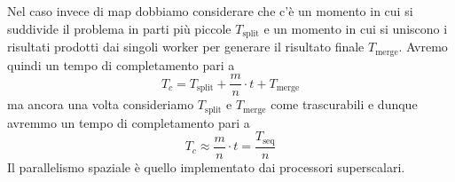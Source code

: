 Nel caso invece di map dobbiamo considerare che c'è un momento in cui si suddivide il problema in
parti più piccole $T_\text{split}$ e un momento in cui si uniscono i risultati prodotti dai singoli
worker per generare il risultato finale $T_\text{merge}$. Avremo quindi un tempo di completamento
pari a
\[ T_c = T_\text{split} + \frac{m}{n} \cdot t + T_\text{merge} \]
ma ancora una volta consideriamo $T_\text{split}$ e $T_\text{merge}$ come trascurabili e dunque
avremmo un tempo di completamento pari a
\[ T_c \approx \frac{m}{n} \cdot t = \frac{T_\text{seq}}{n} \]
Il parallelismo spaziale è quello implementato dai processori superscalari.
